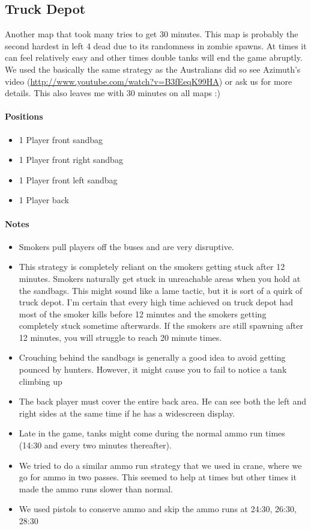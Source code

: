 \subsection{Truck Depot}
Another map that took many tries to get 30 minutes. This map is probably the second hardest in left 4 dead due to its randomness in zombie spawns. At times it can feel relatively easy and other times double tanks will end the game abruptly. We used the basically the same strategy as the Australians did so see Azimuth's video (\url{http://www.youtube.com/watch?v=B3fEeqK99HA}) or ask us for more details. This also leaves me with 30 minutes on all maps :)

\paragraph{Positions}
\begin{itemize}
\item 1 Player front sandbag
\item 1 Player front right sandbag
\item 1 Player front left sandbag
\item 1 Player back
\end{itemize}

\paragraph{Notes}
\begin{itemize}
\item Smokers pull players off the buses and are very disruptive.
\item This strategy is completely reliant on the smokers getting stuck after 12 minutes. Smokers naturally get stuck in unreachable areas when you hold at the sandbags. This might sound like a lame tactic, but it is sort of a quirk of truck depot. I'm certain that every high time achieved on truck depot had most of the smoker kills before 12 minutes and the smokers getting completely stuck sometime afterwards. If the smokers are still spawning after 12 minutes, you will struggle to reach 20 minute times.
\item Crouching behind the sandbags is generally a good idea to avoid getting pounced by hunters. However, it might cause you to fail to notice a tank climbing up
\item The back player must cover the entire back area. He can see both the left and right sides at the same time if he has a widescreen display.
\item Late in the game, tanks might come during the normal ammo run times (14:30 and every two minutes thereafter).
\item We tried to do a similar ammo run strategy that we used in crane, where we go for ammo in two passes. This seemed to help at times but other times it made the ammo runs slower than normal.
\item We used pistols to conserve ammo and skip the ammo runs at 24:30, 26:30, 28:30
\end{itemize}

